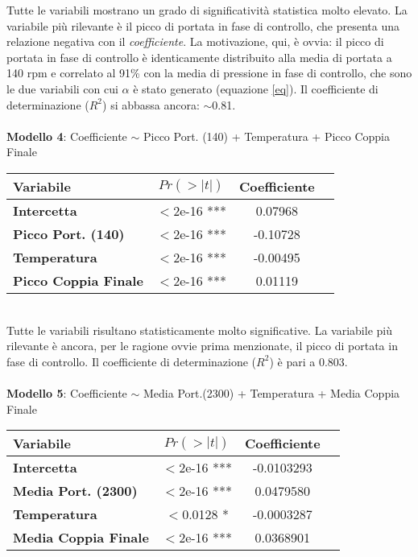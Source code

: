 \documentclass[fleqn,10pt]{SelfArx} %
\begin{document}
Tutte le variabili mostrano un grado di significatività statistica molto elevato. La variabile più rilevante è il picco di portata in fase di controllo, che presenta una relazione negativa con il \textit{coefficiente}. La motivazione, qui, è ovvia: il picco di portata in fase di controllo è identicamente distribuito alla media di portata a 140 rpm e correlato al 91\% con la media di pressione in fase di controllo, che sono le due variabili con cui $\alpha$ è stato generato (equazione \ref{eq}). Il coefficiente di determinazione ($R^2$) si abbassa ancora: $\sim$0.81.\\
\\
\textbf{Modello 4}: Coefficiente $\sim$  Picco Port. (140) + Temperatura + Picco Coppia Finale
{\begin{table}[h] 
\centering
\begin{tabular}[t]{lccc}
\toprule 
Variabile&$Pr(> |t|)$&Coefficiente\\
\midrule 
\textbf{Intercetta}&$<$2e-16 ***&0.07968\\ 
\textbf{Picco Port. (140)}&$<$2e-16 ***&-0.10728\\
\textbf{Temperatura}&$<$2e-16 ***&-0.00495\\
\textbf{Picco Coppia Finale}&$<$2e-16 ***&0.01119\\
\bottomrule 
\end{tabular}
\end{table}}\\
Tutte le variabili risultano statisticamente molto significative. La variabile più rilevante è ancora, per le ragione ovvie prima menzionate, il picco di portata in fase di controllo. Il coefficiente di determinazione ($R^2$) è pari a 0.803.\\ 
\\
\textbf{Modello 5}: Coefficiente $\sim$ Media Port.(2300) + Temperatura + Media Coppia Finale 
{\begin{table}[h] 
\centering
\begin{tabular}[t]{lccc}
\toprule 
Variabile&$Pr(> |t|)$&Coefficiente\\
\midrule 
\textbf{Intercetta}&$<$2e-16 ***&-0.0103293\\ 
\textbf{Media Port. (2300)}&$<$2e-16 ***&0.0479580\\
\textbf{Temperatura}&$<$0.0128 *&-0.0003287\\
\textbf{Media Coppia Finale}&$<$2e-16 ***&0.0368901\\
\bottomrule 
\end{tabular}
\end{table}}\\
\end{document}
